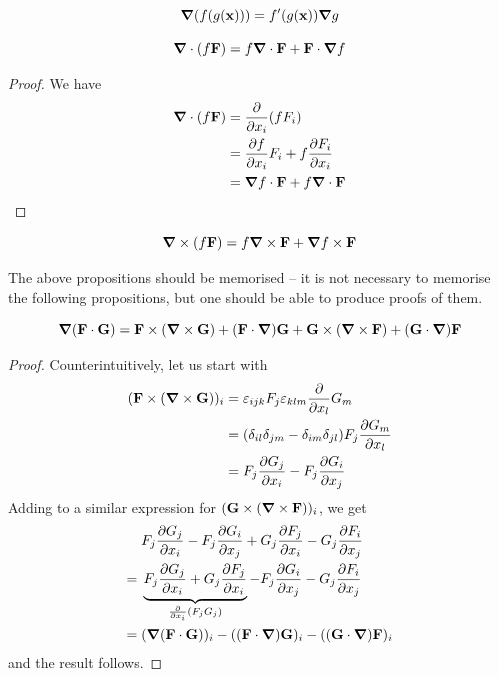 \documentclass{../template/note}
\begin{document}
    \begin{proposition}
        \[
            \grad(f(g(\V x))) = f'(g(\V x))\grad g
        \]
    \end{proposition}

    \begin{proposition}
        \label{2.5}\[
            \grad\cdot (f \V F) = f \grad \cdot \V F + \V F \cdot \grad f
        \]
    \end{proposition}

    \begin{proof}
        We have
        \begin{align*}
            \grad \cdot (f \V F) &= \pd{}{x_i}(fF_i) \\
            &= \pd{f}{x_i}F_i + f\pd{F_i}{x_i} \\
            &= \grad f \cdot \V F + f \grad \cdot \V F
        \end{align*}
    \end{proof}
    
    \begin{proposition}
        \[
            \grad \times (f \V F) = f \grad \times \V F + \grad f \times \V F
        \]
    \end{proposition}

    The above propositions should be memorised -- it is not necessary to memorise the following propositions, but one should be able to produce proofs of them.
    
    \begin{proposition}
        \[
            \grad(\V F \cdot \V G) = \V F \times (\grad \times \V G) + (\V F \cdot \grad) \V G + \V G \times (\grad \times \V F) + (\V G \cdot \grad)\V F
        \]
    \end{proposition}
    
    \begin{proof}
        Counterintuitively, let us start with
        \begin{align*}
            (\V F \times (\grad \times \V G))_i &= \lv{ijk}F_j\lv{klm}\pd{}{x_l}G_m \\
            &= (\delta_{il}\delta_{jm}-\delta_{im}\delta_{jl})F_j \pd{G_m}{x_l} \\
            &= F_j \pd{G_j}{x_i} - F_j \pd{G_i}{x_j}
        \end{align*}
        Adding to a similar expression for \((\V G \times (\grad \times \V F))_i\), we get
        \begin{align*}
            &\;F_j \pd{G_j}{x_i} - F_j \pd{G_i}{x_j} + G_j \pd{F_j}{x_i} - G_j \pd{F_i}{x_j} \\
            =&\; \underbrace{F_j \pd{G_j}{x_i} + G_j \pd{F_j}{x_i}}_{\pd{}{x_i}(F_jG_j)} - F_j \pd{G_i}{x_j} - G_j \pd{F_i}{x_j} \\
            =&\; (\grad(\V F \cdot \V G))_i - ((\V F \cdot \grad)\V G)_i - ((\V G \cdot \grad)\V F)_i
        \end{align*}
        and the result follows.
    \end{proof}
\end{document}
